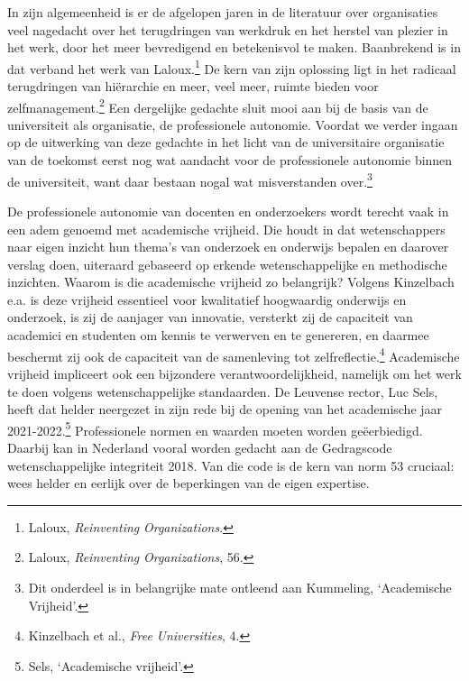 \documentclass[smallauthor, chapterhaspagenum, nochapterinheader, pagenuminheader,  bigchapnum,medium2, tocpages, garamond, titleinheader]{jote-book}
\begin{document}
	In zijn algemeenheid is er de afgelopen jaren in de literatuur over organisaties veel nagedacht over het terugdringen van werkdruk en het herstel van plezier in het werk, door het meer bevredigend en betekenisvol te maken. Baanbrekend is in dat verband het werk van Laloux.\footnote{Laloux, \emph{Reinventing}\emph{ }\emph{Organizations}.} De kern van zijn oplossing ligt in het radicaal terugdringen van hiërarchie en meer, veel meer, ruimte bieden voor zelfmanagement.\footnote{Laloux, \emph{Reinventing}\emph{ }\emph{Organizations}, 56.} Een dergelijke gedachte sluit mooi aan bij de basis van de universiteit als organisatie, de professionele autonomie. Voordat we verder ingaan op de uitwerking van deze gedachte in het licht van de universitaire organisatie van de toekomst eerst nog wat aandacht voor de professionele autonomie binnen de universiteit, want daar bestaan nogal wat misverstanden over.\footnote{Dit onderdeel is in belangrijke mate ontleend aan Kummeling, ‘Academische Vrijheid'.}



	De professionele autonomie van docenten en onderzoekers wordt terecht vaak in een adem genoemd met academische vrijheid. Die houdt in dat wetenschappers naar eigen inzicht hun thema's van onderzoek en onderwijs bepalen en daarover verslag doen, uiteraard gebaseerd op erkende wetenschappelijke en methodische inzichten. Waarom is die academische vrijheid zo belangrijk? Volgens Kinzelbach e.a. is deze vrijheid essentieel voor kwalitatief hoogwaardig onderwijs en onderzoek, is zij de aanjager van innovatie, versterkt zij de capaciteit van academici en studenten om kennis te verwerven en te genereren, en daarmee beschermt zij ook de capaciteit van de samenleving tot zelfreflectie.\footnote{Kinzelbach et al., \emph{Free }\emph{Universities}, 4.} Academische vrijheid impliceert ook een bijzondere verantwoordelijkheid, namelijk om het werk te doen volgens wetenschappelijke standaarden. De Leuvense rector, Luc Sels, heeft dat helder neergezet in zijn rede bij de opening van het academische jaar 2021-2022.\footnote{Sels, ‘Academische vrijheid'.} Professionele normen en waarden moeten worden geëerbiedigd. Daarbij kan in Nederland vooral worden gedacht aan de Gedragscode wetenschappelijke integriteit 2018. Van die code is de kern van norm 53 cruciaal: wees helder en eerlijk over de beperkingen van de eigen expertise.
\end{document}
